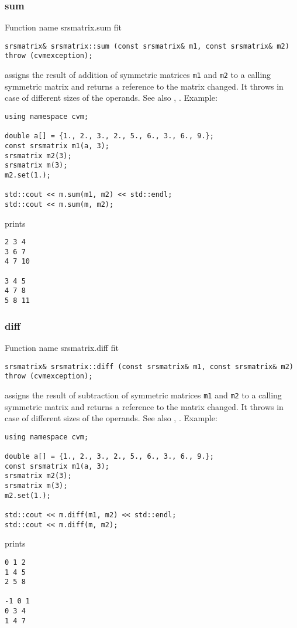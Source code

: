 \subsubsection{sum}
Function%
\pdfdest name {srsmatrix.sum} fit
\begin{verbatim}
srsmatrix& srsmatrix::sum (const srsmatrix& m1, const srsmatrix& m2)
throw (cvmexception);
\end{verbatim}
assigns the result of addition of symmetric
matrices \verb"m1" and \verb"m2"  to a calling symmetric matrix
and returns a reference to
the matrix changed.
It throws  
in case of different sizes of the operands.
See also ,
.
Example:
\begin{Verbatim}
using namespace cvm;

double a[] = {1., 2., 3., 2., 5., 6., 3., 6., 9.};
const srsmatrix m1(a, 3);
srsmatrix m2(3);
srsmatrix m(3);
m2.set(1.);

std::cout << m.sum(m1, m2) << std::endl;
std::cout << m.sum(m, m2);
\end{Verbatim}
prints
\begin{Verbatim}
2 3 4
3 6 7
4 7 10

3 4 5
4 7 8
5 8 11
\end{Verbatim}
\newpage



\subsubsection{diff}
Function%
\pdfdest name {srsmatrix.diff} fit
\begin{verbatim}
srsmatrix& srsmatrix::diff (const srsmatrix& m1, const srsmatrix& m2)
throw (cvmexception);
\end{verbatim}
assigns the result of subtraction of
symmetric matrices \verb"m1" and \verb"m2" to a calling symmetric matrix
and returns a reference to
the matrix changed.
It throws  
in case of different sizes of the operands.
See also ,
.
Example:
\begin{Verbatim}
using namespace cvm;

double a[] = {1., 2., 3., 2., 5., 6., 3., 6., 9.};
const srsmatrix m1(a, 3);
srsmatrix m2(3);
srsmatrix m(3);
m2.set(1.);

std::cout << m.diff(m1, m2) << std::endl;
std::cout << m.diff(m, m2);
\end{Verbatim}
prints
\begin{Verbatim}
0 1 2
1 4 5
2 5 8

-1 0 1
0 3 4
1 4 7
\end{Verbatim}
\newpage



